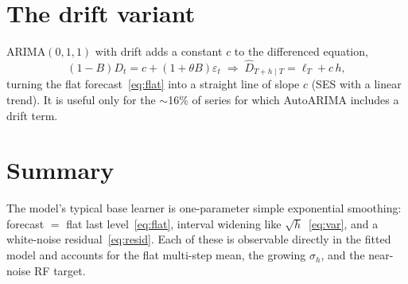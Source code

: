 \documentclass[11pt]{article}
\begin{document}
\section{The drift variant}
ARIMA$(0,1,1)$ with drift adds a constant $c$ to the differenced equation,
\begin{equation}
(1-B)D_t = c + (1+\theta B)\varepsilon_t
\;\Longrightarrow\;
\hat D_{T+h\mid T} = \ell_T + c\,h,
\label{eq:drift}
\end{equation}
turning the flat forecast~\eqref{eq:flat} into a straight line of slope $c$ (SES with a linear
trend). It is useful only for the $\sim$16\% of series for which AutoARIMA includes a drift term.

\section*{Summary}
The model's typical base learner is one-parameter simple exponential smoothing: forecast
$=$ flat last level~\eqref{eq:flat}, interval widening like $\sqrt{h}$~\eqref{eq:var}, and a
white-noise residual~\eqref{eq:resid}. Each of these is observable directly in the fitted model
and accounts for the flat multi-step mean, the growing $\sigma_h$, and the near-noise RF target.
\end{document}
